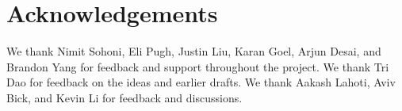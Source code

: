 \section*{Acknowledgements}

We thank Nimit Sohoni, Eli Pugh, Justin Liu, Karan Goel, Arjun Desai, and Brandon Yang for feedback and support throughout the project.
We thank Tri Dao for feedback on the ideas and earlier drafts.
We thank Aakash Lahoti, Aviv Bick, and Kevin Li for feedback and discussions.